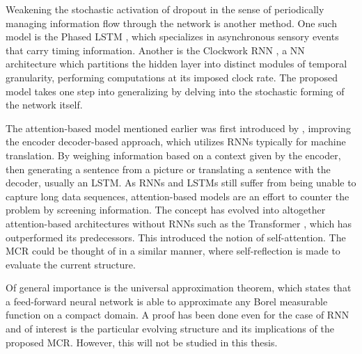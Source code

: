 Weakening the stochastic activation of dropout in the sense of periodically managing information flow through the network is another method. One such model is the Phased LSTM \cite{phaselstm}, which specializes in asynchronous sensory events that carry timing information. Another is the Clockwork RNN \cite{Clockwork}, a NN architecture which partitions the hidden layer into distinct modules of temporal granularity, performing computations at its imposed clock rate. The proposed model takes one step into generalizing by delving into the stochastic forming of the network itself.

The attention-based model mentioned earlier was first introduced by \textcite{att}, improving the encoder decoder-based approach, which utilizes RNNs typically for machine translation. By weighing information based on a context given by the encoder, then generating a sentence from a picture or translating a sentence with the decoder, usually an LSTM. As RNNs and LSTMs still suffer from being unable to capture long data sequences, attention-based models are an effort to counter the problem by screening information. The concept has evolved into altogether attention-based architectures without RNNs such as the Transformer \cite{trans}, which has outperformed its predecessors. This introduced the notion of self-attention. The MCR could be thought of in a similar manner, where self-reflection is made to evaluate the current structure. 

Of general importance is the universal approximation theorem, which states that a feed-forward neural network is able to approximate any Borel measurable function on a compact domain. A proof has been done even for the case of RNN \cite{uarnn} and of interest is the particular evolving structure and its implications of the proposed MCR. However, this will not be studied in this thesis.
